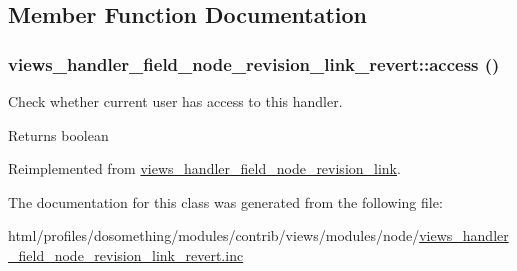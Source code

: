 \subsection{Member Function Documentation}
\hypertarget{classviews__handler__field__node__revision__link__revert_a6cb6e683478e55b9e3e64602dbc8886d}{
\subsubsection[{access}]{\setlength{\rightskip}{0pt plus 5cm}views\_\-handler\_\-field\_\-node\_\-revision\_\-link\_\-revert::access ()}}
\label{classviews__handler__field__node__revision__link__revert_a6cb6e683478e55b9e3e64602dbc8886d}
Check whether current user has access to this handler.

\begin{DoxyReturn}{Returns}
boolean 
\end{DoxyReturn}


Reimplemented from \hyperlink{classviews__handler__field__node__revision__link_a29923ca97bbff1c87c0e9338ec972a07}{views\_\-handler\_\-field\_\-node\_\-revision\_\-link}.

The documentation for this class was generated from the following file:\begin{DoxyCompactItemize}
\item 
html/profiles/dosomething/modules/contrib/views/modules/node/\hyperlink{views__handler__field__node__revision__link__revert_8inc}{views\_\-handler\_\-field\_\-node\_\-revision\_\-link\_\-revert.inc}\end{DoxyCompactItemize}
